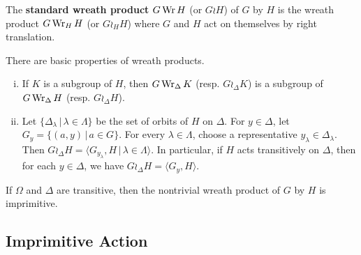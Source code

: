 \begin{definition}
	The \textbf{standard wreath product} $G\operatorname{Wr} H$ (or $G\wr H$) of $G$ by $H$ is the wreath product $G\operatorname{Wr}_H H$ (or $G\wr_H H$) where $G$ and $H$ act on themselves by right translation.
\end{definition}
\begin{proposition}
	There are basic properties of wreath products.
	\begin{enumerate}[(i)]
		\item If $K$ is a subgroup of $H$, then $G\operatorname{Wr}_\Delta K$ (resp. $G\wr_\Delta K$) is a subgroup of $G\operatorname{Wr}_\Delta H$ (resp. $G\wr_\Delta H$).
		\item Let $\{\Delta_{\lambda}\,|\,\lambda\in\Lambda\}$ be the set of orbits of $H$ on $\Delta$. For $y\in \Delta$, let $G_y = \{(a,y)\,|\, a\in G\}$. For every $\lambda\in \Lambda$, choose a representative $y_\lambda\in \Delta_\lambda$.  Then $G\wr_\Delta H = \langle G_{y_\lambda},H\,|\, \lambda\in \Lambda\rangle$. In particular, if $H$ acts transitively on $\Delta$, then for each $y\in \Delta$, we have $G\wr_\Delta H = \langle G_y ,H\rangle$.
	\end{enumerate}
\end{proposition}


\begin{proposition}
	If $\Omega$ and $\Delta$ are transitive, then the nontrivial wreath product of $G$ by $H$ is imprimitive.
\end{proposition}

\subsection{Imprimitive Action}

